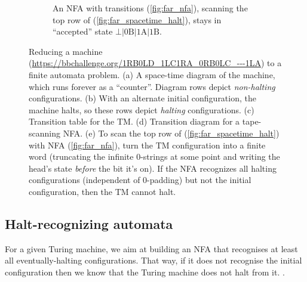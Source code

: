 \begin{figure}
\begin{subfigure}{\textwidth}
    \caption{An NFA with transitions (\ref{fig:far_nfa}), scanning the top row of (\ref{fig:far_spacetime_halt}), stays in ``accepted'' state
      $\bot|\textrm{0B}|\textrm{1A}|\textrm{1B}$.}
    \label{fig:far_scan}
  \end{subfigure}

  \caption{Reducing a machine (\url{https://bbchallenge.org/1RB0LD_1LC1RA_0RB0LC_---1LA}) to a finite automata problem.
    (a) A space-time diagram of the machine, which runs forever as a ``counter''. Diagram rows depict \emph{non-halting} configurations.
    (b) With an alternate initial configuration, the machine halts, so these rows depict \emph{halting} configurations.
    (c) Transition table for the TM.
    (d) Transition diagram for a tape-scanning NFA.
    (e) To scan the top row of (\ref{fig:far_spacetime_halt}) with NFA (\ref{fig:far_nfa}), turn the TM configuration into a finite word
        (truncating the infinite 0-strings at some point and writing the head's state \emph{before} the bit it's on).
        If the NFA recognizes all halting configurations (independent of 0-padding) but not the initial configuration, then the TM cannot halt.}
  \label{fig:finite-automata-reduction}
\end{figure}


\subsection{Halt-recognizing automata}
\newcommand{\M}{M}
\label{far-defs-recognizer}
For a given Turing machine, we aim at building an NFA that recognises at least all eventually-halting configurations. That way, if it does not recognise the initial configuration then we know that the Turing machine does not halt from it.
.


